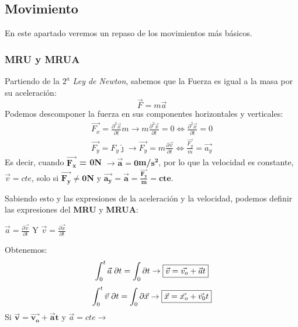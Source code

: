 \subsection{Movimiento}
\noindent En este apartado veremos un repaso de los movimientos más básicos.


\subsubsection{MRU y MRUA}

\noindent Partiendo de la \textit{\(2^a\) Ley de Newton}, sabemos que la Fuerza es igual a la masa por su aceleración:
\[\vec{F} = m\vec{a}\]
Podemos descomponer la fuerza en sus componentes horizontales y verticales:
\begin{align*}
        \vec{F_{x}}=\frac{\partial^{2}\vec{x}}{\partial{t}}m
        \to
        m\frac{\partial^2 \vec{x}}{\partial t} = 0
        \Leftrightarrow
        \frac{\partial^2{\vec{x}}}{\partial{t}} = 0
        \\
        \vec{F_{y}}=F_{y}\hat{\jmath}
        \to
        \vec{F_y} = m\frac{\partial\vec{v}}{\partial t}\Leftrightarrow
        \frac{\vec{F_y}}{m} = \vec{a_y}
\end{align*}
Es decir, cuando \(\bm{\vec{F_x}}\)\textbf{ = 0N} \(\bm{\to\vec{a}=0}\)\textbf{m/}\(\bm{s^2}\), por lo que la velocidad es constante, \(\vec{v}=cte\), solo si \(\bm{\vec{F_y}\neq 0}\)\textbf{N} y \(\bm{\vec{a_y} = \vec{a} = \frac{\vec{F_y}}{m}=cte}\).\par \vspace{0.5cm} \noindent Sabiendo esto y las expresiones de la aceleración y la velocidad, podemos definir las expresiones del \textbf{MRU} y \textbf{MRUA}: \par \vspace{0.5cm} \hspace{5cm}
\( \vec{a} = \frac{\partial \vec{v} }{\partial t}\) Y \( \vec{v} = \frac{\partial \vec{x} }{\partial t}\) \par \vspace{0.5cm} Obtenemos:
\[
        \int_{0}^{t}{\vec{a}\hspace{1mm}\partial{t}} = \int_{0}\partial{t}
        \to
        \boxed{\vec{v} = \vec{v_o} + \vec{a}t}
\]
\[
        \int_{0}^{t}{\vec{v}\hspace{1mm}\partial{t}} = \int_{0}{\partial{\vec{x}}}
        \to
        \boxed{\vec{x} = \vec{x_o} + \vec{v_0}t}
\]
\hspace{2.3cm} Si \( \bm{\vec{v} = \vec{v_o} + \vec{a}t}\)
y
\( \vec{a} = cte \to\) 
